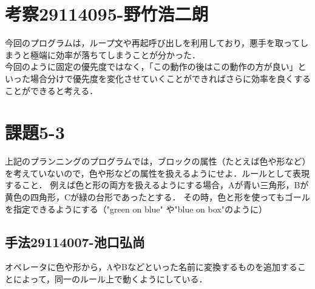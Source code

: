 \documentclass{jarticle}
\begin{document}
\section{考察29114095-野竹浩二朗}
今回のプログラムは，ループ文や再起呼び出しを利用しており，悪手を取ってしまうと極端に効率が落ちてしまうことが分かった．\\
今回のように固定の優先度ではなく，「この動作の後はこの動作の方が良い」といった場合分けで優先度を変化させていくことができればさらに効率を良くすることができると考える．


\section{課題5-3}
\begin{screen}
    上記のプランニングのプログラムでは，ブロックの属性（たとえば色や形など）を考えていないので，色や形などの属性を扱えるようにせよ．ルールとして表現すること．
    例えば色と形の両方を扱えるようにする場合，Aが青い三角形，Bが黄色の四角形，Cが緑の台形であったとする．
    その時，色と形を使ってもゴールを指定できるようにする（"green on blue" や"blue on box"のように）
\end{screen}
\subsection{手法29114007-池口弘尚}
オペレータに色や形から，AやBなどといった名前に変換するものを追加することによって，同一のルール上で動くようにしている．
\end{document}
